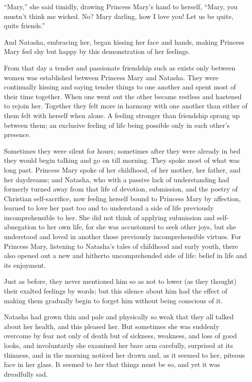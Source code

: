 ``Mary,'' she said timidly, drawing Princess Mary's hand to
herself, ``Mary, you mustn't think me wicked. No? Mary darling,
how I love you!  Let us be quite, quite friends.''

And Natasha, embracing her, began kissing her face and hands,
making Princess Mary feel shy but happy by this demonstration of
her feelings.

From that day a tender and passionate friendship such as exists
only between women was established between Princess Mary and
Natasha. They were continually kissing and saying tender things
to one another and spent most of their time together. When one
went out the other became restless and hastened to rejoin
her. Together they felt more in harmony with one another than
either of them felt with herself when alone. A feeling stronger
than friendship sprang up between them; an exclusive feeling of
life being possible only in each other's presence.

Sometimes they were silent for hours; sometimes after they were
already in bed they would begin talking and go on till
morning. They spoke most of what was long past. Princess Mary
spoke of her childhood, of her mother, her father, and her
daydreams; and Natasha, who with a passive lack of understanding
had formerly turned away from that life of devotion, submission,
and the poetry of Christian self-sacrifice, now feeling herself
bound to Princess Mary by affection, learned to love her past too
and to understand a side of life previously incomprehensible to
her. She did not think of applying submission and self-abnegation
to her own life, for she was accustomed to seek other joys, but
she understood and loved in another those previously
incomprehensible virtues. For Princess Mary, listening to
Natasha's tales of childhood and early youth, there also opened
out a new and hitherto uncomprehended side of life: belief in
life and its enjoyment.

Just as before, they never mentioned him so as not to lower (as
they thought) their exalted feelings by words; but this silence
about him had the effect of making them gradually begin to forget
him without being conscious of it.

Natasha had grown thin and pale and physically so weak that they
all talked about her health, and this pleased her. But sometimes
she was suddenly overcome by fear not only of death but of
sickness, weakness, and loss of good looks, and involuntarily she
examined her bare arm carefully, surprised at its thinness, and
in the morning noticed her drawn and, as it seemed to her,
piteous face in her glass. It seemed to her that things must be
so, and yet it was dreadfully sad.

